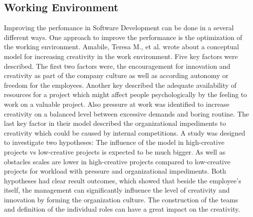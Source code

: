 \subsection{Working Environment}
Improving the perfomance in Software Development can be done in a several different ways. One approach to improve the performance is the optimization of the working environment. Amabile, Teresa M., et al. \cite{amabile1996assessing} wrote about a conceptual model for increasing creativity in the work environment. Five key factors were described. The first two factors were, the encouragement for innovation and creativity as part of the company culture as well as according autonomy or freedom for the employees. Another key described the adequate availability of resources for a project which might affect people psychologically by the feeling to work on a valuable project. Also pressure at work was identified to increase creativity on a balanced level between excessive demands and boring routine. The last key factor in their model described the organizational impediments to creativity which could be caused by internal competitions.
A study was designed to investigate two hypotheses: The influence of the model in high-creative projects vs low-creative projects is expected to be much bigger. As well as obstacles scales are lower in high-creative projects compared to low-creative projects for workload with pressure and organizational impediments.
Both hypotheses had clear result outcomes, which showed that beside the employee's itself, the management can significantly influence the level of creativity and innovation by forming the organization culture. The construction of the teams and definition of the individual roles can have a great impact on the creativity. 

